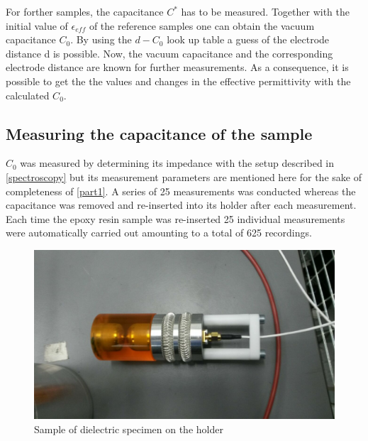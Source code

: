 For forther samples, the capacitance $C^*$ has to be measured. Together with the initial value of $\epsilon_{eff}$ of the reference samples one can obtain the vacuum capacitance $C_0$. By using the $d-C_0$ look up table a guess of the electrode distance d is possible. Now, the vacuum capacitance and the corresponding electrode distance are known for further measurements. As a consequence, it is possible to get the the values and changes in the effective permittivity with the calculated $C_0$.


\subsection{Measuring the capacitance of the sample}

$C_0$ was measured by determining its impedance with the setup described in \ref{spectroscopy} but its measurement
parameters are mentioned here for the sake of completeness of \ref{part1}.
A series of 25 measurements was conducted whereas the capacitance was removed
and re-inserted into its holder after each measurement. Each time the epoxy resin sample was
re-inserted 25 individual measurements were automatically carried out amounting to a total of 625 recordings.

\begin{figure}[h!tb]
	\centering
	\includegraphics[width=\textwidth]{figures/Method/Experimentaufbau/epoxy.jpg}		
	\caption[Kurze Abbildungsbeschreibung]{Sample of dielectric specimen on the holder} \label{fig.comsol_beispiel}

\end{figure}


